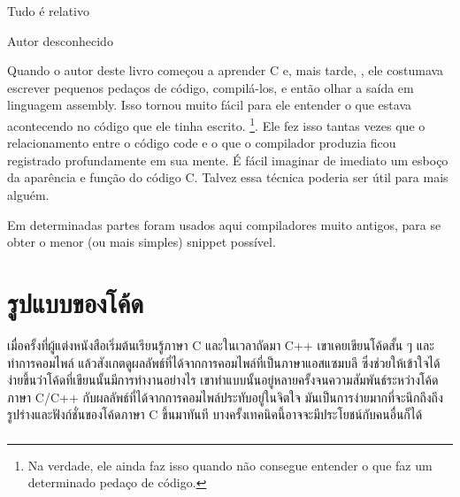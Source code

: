 \epigraph{Tudo é relativo}{Autor desconhecido}

Quando o autor deste livro começou a aprender C e, mais tarde, \Cpp, ele costumava escrever pequenos pedaços de código, compilá-los, 
e então olhar a saída em linguagem assembly. Isso tornou muito fácil para ele entender o que estava acontecendo no código que ele tinha escrito.
\footnote{Na verdade, ele ainda faz isso quando não consegue entender o que faz um determinado pedaço de código.}. 
Ele fez isso tantas vezes que o relacionamento entre o código \CCpp code e o que o compilador produzia ficou registrado profundamente em sua mente. 
É fácil imaginar de imediato um esboço da aparência e função do código C. 
Talvez essa técnica poderia ser útil para mais alguém.


Em determinadas partes foram usados aqui compiladores muito antigos, para se obter o menor (ou mais simples) snippet possível.
\fi
\fi %

\ifdefined\THAI
\part{รูปแบบของโค้ด}

เมื่อครั้งที่ผู้แต่งหนังสือเริ่มต้นเรียนรู้ภาษา C และในเวลาถัดมา C++ เขาเคยเขียนโค้ดสั้น ๆ และทำการคอมไพล์ แล้วสังเกตดูผลลัพธ์ที่ได้จากการคอมไพล์ที่เป็นภาษาแอสแซมบลี ซึ่งช่วยให้เข้าใจได้ง่ายขึ้นว่าโค้ดที่เขียนนั้นมีการทำงานอย่างไร เขาทำแบบนั้นอยู่หลายครั้งจนความสัมพันธ์ระหว่างโค้ดภาษา C/C++ กับผลลัพธ์ที่ได้จากการคอมไพล์ประทับอยู่ในจิตใจ มันเป็นการง่ายมากที่จะนึกถึงถึงรูปร่างและฟังก์ชั่นของโค้ดภาษา C ขึ้นมาทันที บางครั้งเทคนิคนี้อาจจะมีประโยชน์กับคนอื่นก็ได้	
\fi %

\ifdefined\IncludeExercises
\section*{\Exercises}

